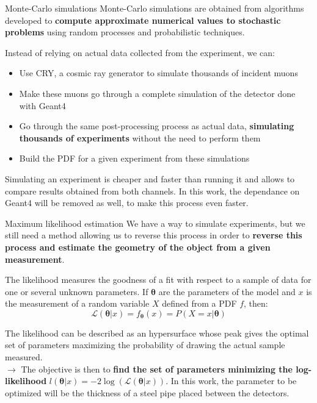 \documentclass[8 pt]{beamer}
\begin{document}
\begin{frame}{Monte-Carlo simulations}
\justifying
Monte-Carlo simulations are obtained from algorithms developed to \textbf{compute approximate numerical values to stochastic problems} using random processes and probabilistic techniques. \vfill

Instead of relying on actual data collected from the experiment, we can:
\begin{itemize}
\justifying
\item Use CRY, a cosmic ray generator to simulate thousands of incident muons
\item Make these muons go through a complete simulation of the detector done with Geant4
\item Go through the same post-processing process as actual data, \textbf{simulating thousands of experiments} without the need to perform them
\item Build the PDF for a given experiment from these simulations
\end{itemize} \vfill

Simulating an experiment is cheaper and faster than running it and allows to compare results obtained from both channels. In this work, the dependance on Geant4 will be removed as well, to make this process even faster. \vfill
\end{frame}

\begin{frame}{Maximum likelihood estimation}
\justifying
We have a way to simulate experiments, but we still need a method allowing us to reverse this process in order to \textbf{reverse this process and estimate the geometry of the object from a given measurement}. \vfill

The likelihood measures the goodness of a fit with respect to a sample of data for one or several unknown parameters. If $\bm \theta$ are the parameters of the model and $x$ is the measurement of a random variable $X$ defined from a PDF $f$, then:
\begin{equation*}
\label{eq:likelihood}
\mathcal{L}(\bm \theta | x) = f_{\bm \theta}(x) = P(X = x | \bm \theta)
\end{equation*} \vfill

The likelihood can be described as an hypersurface whose peak gives the optimal set of parameters maximizing the probability of drawing the actual sample measured. \\ \vspace{5pt}
\hspace{10pt} $\rightarrow$ The objective is then to \textbf{find the set of parameters minimizing the log-likelihood} $l(\bm \theta | x) = -2 \log(\mathcal{L}(\bm \theta | x))$. In this work, the parameter to be optimized will be the thickness of a steel pipe placed between the detectors. \vfill
\end{frame}
\end{document}
